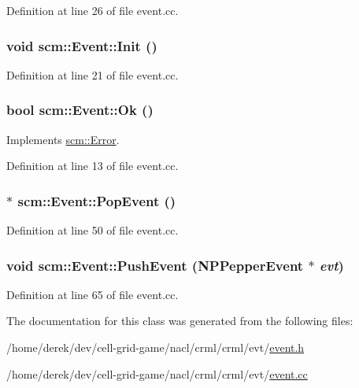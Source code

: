 Definition at line 26 of file event.cc.

\hypertarget{classscm_1_1_event_a2dfdf12d5b7918b2102e7ce1c4142ed3}{
\subsubsection[{Init}]{\setlength{\rightskip}{0pt plus 5cm}void scm::Event::Init ()}}
\label{classscm_1_1_event_a2dfdf12d5b7918b2102e7ce1c4142ed3}


Definition at line 21 of file event.cc.

\hypertarget{classscm_1_1_event_a95400a0d0218dfb664c028d1130a5d14}{
\subsubsection[{Ok}]{\setlength{\rightskip}{0pt plus 5cm}bool scm::Event::Ok ()}}
\label{classscm_1_1_event_a95400a0d0218dfb664c028d1130a5d14}


Implements \hyperlink{classscm_1_1_error_a2660b73f9671be3f286bed9d622a926a}{scm::Error}.



Definition at line 13 of file event.cc.

\hypertarget{classscm_1_1_event_aaa7905956b3d789fa16cc7a73490dc5e}{
\subsubsection[{PopEvent}]{ $\ast$ scm::Event::PopEvent ()}}
\label{classscm_1_1_event_aaa7905956b3d789fa16cc7a73490dc5e}


Definition at line 50 of file event.cc.

\hypertarget{classscm_1_1_event_a1e1aa9fbe9b5e7e7c9b0ff8f0ba74cd2}{
\subsubsection[{PushEvent}]{\setlength{\rightskip}{0pt plus 5cm}void scm::Event::PushEvent ({\bf NPPepperEvent} $\ast$ {\em evt})}}
\label{classscm_1_1_event_a1e1aa9fbe9b5e7e7c9b0ff8f0ba74cd2}


Definition at line 65 of file event.cc.



The documentation for this class was generated from the following files:\begin{DoxyCompactItemize}
\item 
/home/derek/dev/cell-\/grid-\/game/nacl/crml/crml/evt/\hyperlink{event_8h}{event.h}\item 
/home/derek/dev/cell-\/grid-\/game/nacl/crml/crml/evt/\hyperlink{event_8cc}{event.cc}\end{DoxyCompactItemize}
